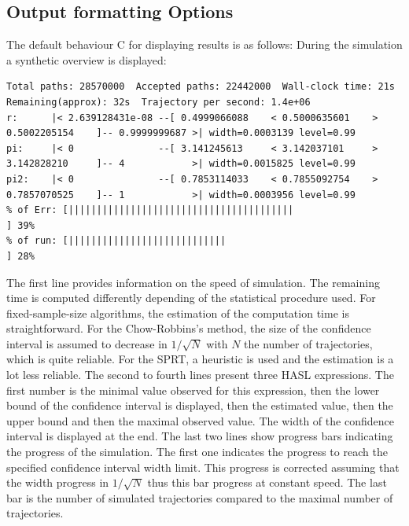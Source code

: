 \documentclass{article}
\newcommand{\cosmos}{\mbox{\textup{C}\scalebox{0.75}{{\textsc{OSMOS}}}}}
\begin{document}
\subsection{Output formatting Options}
The default behaviour \cosmos{} for displaying results is as follows:
During the simulation a synthetic overview is displayed:
\begin{scriptsize}
\begin{verbatim}
Total paths: 28570000  Accepted paths: 22442000  Wall-clock time: 21s  Remaining(approx): 32s  Trajectory per second: 1.4e+06
r:      |< 2.639128431e-08 --[ 0.4999066088    < 0.5000635601    > 0.5002205154    ]-- 0.9999999687 >| width=0.0003139 level=0.99
pi:     |< 0               --[ 3.141245613     < 3.142037101     > 3.142828210     ]-- 4            >| width=0.0015825 level=0.99
pi2:    |< 0               --[ 0.7853114033    < 0.7855092754    > 0.7857070525    ]-- 1            >| width=0.0003956 level=0.99
% of Err: [||||||||||||||||||||||||||||||||||||||||                                                       ] 39%	
% of run: [||||||||||||||||||||||||||||                                                                   ] 28%	
\end{verbatim}
\end{scriptsize}
The first line provides information on the speed of simulation. The
remaining time is computed differently depending of the statistical
procedure used. For fixed-sample-size algorithms, the estimation of
the computation time is straightforward. For the Chow-Robbins’s method,
the size of the confidence interval is assumed to decrease in
$1/\sqrt{N}$ with $N$ the number of trajectories, which is quite
reliable. For the SPRT, a heuristic is used and the estimation is a lot
less reliable.  The second to fourth lines present three HASL
expressions. The first number is the minimal value observed for this
expression, then the lower bound of the confidence interval is
displayed, then the estimated value, then the upper bound and then the
maximal observed value. The width of the confidence interval is
displayed at the end.  The last two lines show progress bars indicating
the progress of the simulation. The first one indicates the progress to
reach the specified confidence interval width limit. This progress is
corrected assuming that the width progress in $1/\sqrt{N}$ thus this
bar progress at constant speed. The last bar is the number of
simulated trajectories compared to the maximal number of trajectories.
\end{document}
